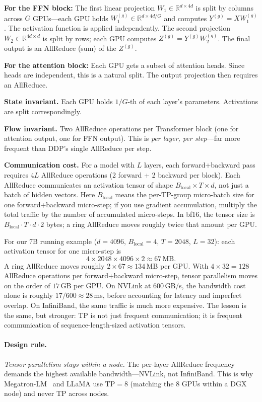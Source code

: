 \textbf{For the FFN block:} The first linear projection $W_1 \in \mathbb{R}^{d \times 4d}$ is split by columns across $G$ GPUs---each GPU holds $W_1^{(g)} \in \mathbb{R}^{d \times 4d/G}$ and computes $Y^{(g)} = XW_1^{(g)}$. The activation function is applied independently. The second projection $W_2 \in \mathbb{R}^{4d \times d}$ is split by rows; each GPU computes $Z^{(g)} = Y^{(g)} W_2^{(g)}$. The final output is an AllReduce (sum) of the $Z^{(g)}$.

\textbf{For the attention block:} Each GPU gets a subset of attention heads. Since heads are independent, this is a natural split. The output projection then requires an AllReduce.

\textbf{State invariant.} Each GPU holds $1/G$-th of each layer's parameters. Activations are split correspondingly.

\textbf{Flow invariant.} Two AllReduce operations per Transformer block (one for attention output, one for FFN output). This is \emph{per layer, per step}---far more frequent than DDP's single AllReduce per step.

\textbf{Communication cost.} For a model with $L$ layers, each forward+backward pass requires $4L$ AllReduce operations (2 forward + 2 backward per block). Each AllReduce communicates an activation tensor of shape $B_{\text{local}} \times T \times d$, not just a batch of hidden vectors. Here $B_{\text{local}}$ means the per-TP-group micro-batch size for one forward+backward micro-step; if you use gradient accumulation, multiply the total traffic by the number of accumulated micro-steps. In bf16, the tensor size is $B_{\text{local}} \cdot T \cdot d \cdot 2$ bytes; a ring AllReduce moves roughly twice that amount per GPU.

For our 7B running example ($d = 4096$, $B_{\text{local}} = 4$, $T = 2048$, $L = 32$): each activation tensor for one micro-step is
\[
  4 \times 2048 \times 4096 \times 2 \approx 67\,\text{MB}.
\]
A ring AllReduce moves roughly $2 \times 67 \approx 134$\,MB per GPU. With $4 \times 32 = 128$ AllReduce operations per forward+backward micro-step, tensor parallelism moves on the order of $17$\,GB per GPU. On NVLink at 600\,GB/s, the bandwidth cost alone is roughly $17/600 \approx 28$\,ms, before accounting for latency and imperfect overlap. On InfiniBand, the same traffic is much more expensive. The lesson is the same, but stronger: TP is not just frequent communication; it is frequent communication of sequence-length-sized activation tensors.

\paragraph{Design rule.} \emph{Tensor parallelism stays within a node.} The per-layer AllReduce frequency demands the highest available bandwidth---NVLink, not InfiniBand. This is why Megatron-LM~\cite{shoeybi2019megatron} and LLaMA use TP$=$8 (matching the 8 GPUs within a DGX node) and never TP across nodes.


